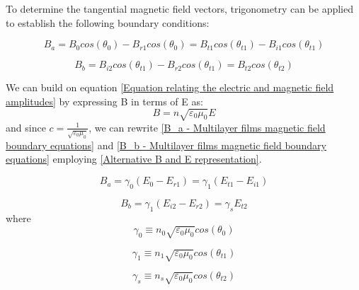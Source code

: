 To determine the tangential magnetic field vectors, trigonometry can be applied to establish the following boundary conditions:

    \begin{equation} \label{B_a - Multilayer films magnetic field boundary equations}
    B_a = B_0cos(\theta_0) - B_{r1}cos(\theta_0) = B_{t1}cos(\theta_{t1}) - B_{i1}cos(\theta_{t1})
    \end{equation}

    \begin{equation} \label{B_b - Multilayer films magnetic field boundary equations}
    B_b = B_{i2}cos(\theta_{t1}) - B_{r2}cos(\theta_{t1}) = B_{t2}cos(\theta_{t2})
    \end{equation}

We can build on equation \ref{Equation relating the electric and magnetic field amplitudes} by expressing B in terms of E as:
    \begin{equation} \label{Alternative B and E representation}
    B = n\sqrt{\varepsilon_0\mu_0}E
    \end{equation}
and since $c=\frac{1}{\sqrt{\varepsilon_0\mu_0}}$, we can rewrite \ref{B_a - Multilayer films magnetic field boundary equations} and \ref{B_b - Multilayer films magnetic field boundary equations} employing \ref{Alternative B and E representation}.

    \begin{equation} \label{Alternative B_a - Multilayer films magnetic field boundary equations}
    B_a = \gamma_0(E_0 - E_{r1}) = \gamma_1(E_{t1} - E_{i1})
    \end{equation}

    \begin{equation} \label{Alternative B_b - Multilayer films magnetic field boundary equations}
    B_b = \gamma_1(E_{i2} - E_{r2}) = \gamma_sE_{t2}
    \end{equation}
where
    \begin{equation} \label{gamma 0}
        \gamma_0 \equiv n_0 \sqrt{\varepsilon_0\mu_0} cos(\theta_0)
    \end{equation}

    \begin{equation} \label{gamma 1}
        \gamma_1 \equiv n_1 \sqrt{\varepsilon_0\mu_0} cos(\theta_{t1})
    \end{equation}

    \begin{equation} \label{gamma s}
        \gamma_s \equiv n_s \sqrt{\varepsilon_0\mu_0} cos(\theta_{t2})
    \end{equation}

